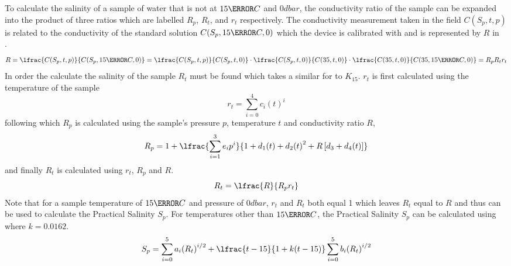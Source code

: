 To calculate the salinity of a sample of water that is not at $15\degree C$ and $0 dbar$, the conductivity ratio of the sample can be expanded into the product of three ratios which are labelled $R_p$, $R_t$, and $r_t$ respectively.
The conductivity measurement taken in the field $C(S_p, t, p)$ is related to the conductivity of the standard solution $C(S_p, 15\degree C, 0)$ which the device is calibrated with and is represented by $R$ in .~\cite{ioc_teos_2010}
\begin{equation}\label{eq:pss-78-full-ratio}
    R = \lfrac{C(S_p, t, p)}{C(S_p, 15\degree C, 0)} = \lfrac{C(S_p, t, p)}{C(S_p, t, 0)} \cdot \lfrac{C(S_p, t, 0)}{C(35, t, 0)} \cdot \lfrac{C(35, t, 0)}{C(35, 15\degree C, 0)} = R_p R_t r_t
\end{equation}
In order the calculate the salinity of the sample $R_t$ must be found which takes a similar for to $K_{15}$.
$r_t$ is first calculated using the temperature of the sample 
\begin{equation}\label{eq:pss-78-rt}
    r_t = \sum_{i=0}^{4} c_i {(t)}^i
\end{equation}
following which $R_p$ is calculated using the sample's pressure $p$, temperature $t$ and conductivity ratio $R$,
\begin{equation}\label{eq:pss-78-rp}
    R_p = 1 + \lfrac{\sum_{i=1}^{3} e_i p^i}{1 + d_1 (t) + d_2 {(t)}^2 + R\left[ d_3 + d_4 (t) \right]}
\end{equation}
and finally $R_t$ is calculated using $r_t$, $R_p$ and $R$.
\begin{equation}\label{eq:pss-78-Rt}
    R_t = \lfrac{R}{R_p r_t}
\end{equation}
Note that for a sample temperature of $15\degree C$ and pressure of $0 dbar$, $r_t$ and $R_t$ both equal 1 which leaves $R_t$ equal to $R$ and thus  can be used to calculate the Practical Salinity $S_p$.
For temperatures other than $15\degree C$, the Practical Salinity $S_p$ can be calculated using  where $k = 0.0162$.
\begin{equation}\label{eq:pss-78-full}
    S_p = \sum_{i=0}^{5} a_i {(R_t)}^{i/2} + \lfrac{t-15}{1+k(t-15)} \sum_{i=0}^{5} b_i {(R_t)}^{i/2}
\end{equation}

